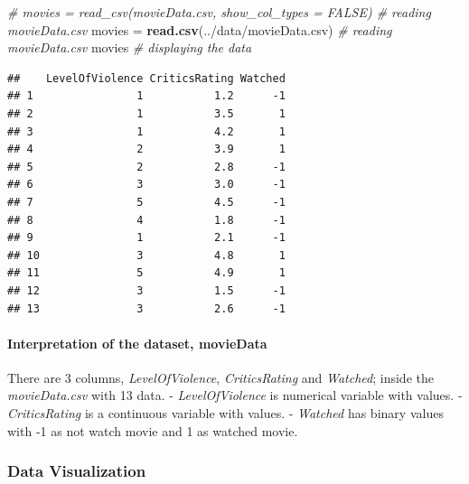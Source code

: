 \documentclass[
]{article}
\newenvironment{Shaded}{\begin{snugshade}}{\end{snugshade}}
\newcommand{\CommentTok}[1]{\textcolor[rgb]{0.56,0.35,0.01}{\textit{#1}}}
\newcommand{\FunctionTok}[1]{\textcolor[rgb]{0.13,0.29,0.53}{\textbf{#1}}}
\newcommand{\NormalTok}[1]{#1}
\newcommand{\OtherTok}[1]{\textcolor[rgb]{0.56,0.35,0.01}{#1}}
\newcommand{\StringTok}[1]{\textcolor[rgb]{0.31,0.60,0.02}{#1}}
\begin{document}
\begin{Shaded}
\begin{Highlighting}[]
\CommentTok{\# movies = read\_csv(\textquotesingle{}movieData.csv\textquotesingle{}, show\_col\_types = FALSE) \# reading movieData.csv}
\NormalTok{movies }\OtherTok{=} \FunctionTok{read.csv}\NormalTok{(}\StringTok{\textquotesingle{}../data/movieData.csv\textquotesingle{}}\NormalTok{) }\CommentTok{\# reading movieData.csv}
\NormalTok{movies }\CommentTok{\# displaying the data}
\end{Highlighting}
\end{Shaded}

\begin{verbatim}
##    LevelOfViolence CriticsRating Watched
## 1                1           1.2      -1
## 2                1           3.5       1
## 3                1           4.2       1
## 4                2           3.9       1
## 5                2           2.8      -1
## 6                3           3.0      -1
## 7                5           4.5      -1
## 8                4           1.8      -1
## 9                1           2.1      -1
## 10               3           4.8       1
## 11               5           4.9       1
## 12               3           1.5      -1
## 13               3           2.6      -1
\end{verbatim}

\paragraph{Interpretation of the dataset,
movieData}\label{interpretation-of-the-dataset-moviedata}

There are 3 columns, \emph{LevelOfViolence}, \emph{CriticsRating} and
\emph{Watched}; inside the \emph{movieData.csv} with 13 data. -
\emph{LevelOfViolence} is numerical variable with values. -
\emph{CriticsRating} is a continuous variable with values. -
\emph{Watched} has binary values with -1 as not watch movie and 1 as
watched movie.

\subsubsection{Data Visualization}\label{data-visualization}
\end{document}
